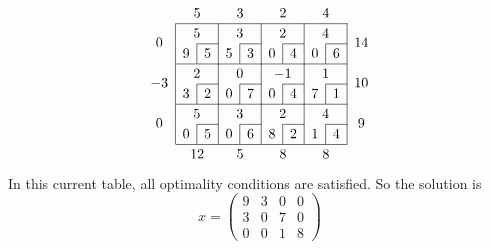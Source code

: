 \[
	\arraycolsep=5pt\def\arraystretch{1.2}
	\begin{array}{c|c|c|c|c|c|c|c|c|c}
		\multicolumn{1}{c}{}    & \multicolumn{2}{c}{5}  & \multicolumn{2}{c}{3}  & \multicolumn{2}{c}{2}   & \multicolumn{2}{c}{4}  & \multicolumn{1}{c}{}                                       \\\cline{2-9}
		\multirow{2}{*}{\(0\)}  & \multicolumn{2}{c|}{5} & \multicolumn{2}{c|}{3} & \multicolumn{2}{c|}{2}  & \multicolumn{2}{c|}{4} & \multirow{2}{*}{\(14\)}                                    \\\cline{3-3}\cline{5-5}\cline{7-7}\cline{9-9}
		                        & \multicolumn{1}{c|}{9} & 5                      & \multicolumn{1}{c|}{5}  & 3                      & \multicolumn{1}{c|}{0}  & 4 & \multicolumn{1}{c|}{0} & 6 & \\\cline{2-9}
		\multirow{2}{*}{\(-3\)} & \multicolumn{2}{c|}{2} & \multicolumn{2}{c|}{0} & \multicolumn{2}{c|}{-1} & \multicolumn{2}{c|}{1} & \multirow{2}{*}{\(10\)}                                    \\\cline{3-3}\cline{5-5}\cline{7-7}\cline{9-9}
		                        & \multicolumn{1}{c|}{3} & 2                      & \multicolumn{1}{c|}{0}  & 7                      & \multicolumn{1}{c|}{0}  & 4 & \multicolumn{1}{c|}{7} & 1 & \\\cline{2-9}
		\multirow{2}{*}{\(0\)}  & \multicolumn{2}{c|}{5} & \multicolumn{2}{c|}{3} & \multicolumn{2}{c|}{2}  & \multicolumn{2}{c|}{4} & \multirow{2}{*}{\(9\)}                                     \\\cline{3-3}\cline{5-5}\cline{7-7}\cline{9-9}
		                        & \multicolumn{1}{c|}{0} & 5                      & \multicolumn{1}{c|}{0}  & 6                      & \multicolumn{1}{c|}{8}  & 2 & \multicolumn{1}{c|}{1} & 4 & \\\cline{2-9}
		\multicolumn{1}{c}{}    & \multicolumn{2}{c}{12} & \multicolumn{2}{c}{5}  & \multicolumn{2}{c}{8}   & \multicolumn{2}{c}{8}  & \multicolumn{1}{c}{}
	\end{array}
\]
In this current table, all optimality conditions are satisfied.
So the solution is
\[
	x = \begin{pmatrix}
		9 & 3 & 0 & 0 \\
		3 & 0 & 7 & 0 \\
		0 & 0 & 1 & 8
	\end{pmatrix}
\]
